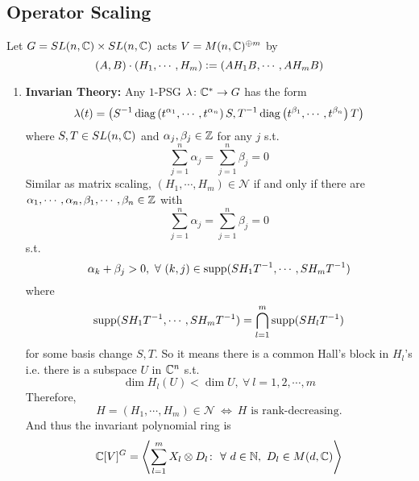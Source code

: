 \documentclass[a4paper,12pt]{article}
\begin{document}
	\subsection{Operator Scaling}
	
	Let $G = SL(n,\mathbb{C}) \times SL(n,\mathbb{C})$ acts $V = M(n,\mathbb{C})^{\oplus m}$ by
	\begin{equation*}
		(A,B) \cdot (H_1,\cdots,H_m) \vcentcolon= (AH_1B,\cdots,AH_mB)
	\end{equation*}
	
\begin{enumerate}
	\item \textbf{Invarian Theory:} Any $1$-PSG $\lambda \colon \mathbb{C}^* \rightarrow G$ has the form
		\begin{equation*}
			\lambda(t) = \left(S^{-1}\operatorname{diag}\left(t^{\alpha_1},\cdots,t^{\alpha_n}\right)S,T^{-1}\operatorname{diag}\left(t^{\beta_1},\cdots,t^{\beta_n}\right)T\right)
		\end{equation*}
		where $S,T \in SL(n,\mathbb{C})$ and $\alpha_j,\beta_j \in \mathbb{Z}$ for any $j$ s.t.
		\begin{equation*}
			\sum_{j=1}^n \alpha_j = \sum_{j=1}^n \beta_j = 0
		\end{equation*}
		Similar as matrix scaling, $(H_1,\cdots,H_m) \in \mathcal{N}$ if and only if there are \\
		$\alpha_1,\cdots,\alpha_n,\beta_1,\cdots,\beta_n \in \mathbb{Z}$ with
		\begin{equation*}
			\sum_{j=1}^n \alpha_j = \sum_{j=1}^n \beta_j = 0
		\end{equation*}
		s.t. 
		\begin{equation*}
			\alpha_k+\beta_j > 0,~\forall~ (k,j) \in \operatorname{supp}(SH_1T^{-1},\cdots,SH_mT^{-1})
		\end{equation*}
		where 
		\begin{equation*}
			\operatorname{supp}(SH_1T^{-1},\cdots,SH_mT^{-1}) = \bigcap_{l=1}^m\operatorname{supp}(SH_lT^{-1})
		\end{equation*}
		for some basis change $S,T$. So it means there is a common Hall's block in $H_l$'s i.e. there is a subspace $U$ in $\mathbb{C}^n$ s.t.
		\begin{equation*}
			\dim H_l(U) < \dim U,~\forall~l=1,2,\cdots,m
		\end{equation*}
		Therefore,
		\begin{equation*}
			H = (H_1,\cdots,H_m) \in \mathcal{N}~\Leftrightarrow~ H \text{ is rank-decreasing.}
		\end{equation*}
		And thus the invariant polynomial ring is
		\begin{equation*}
			\C[V]^G =  \inn{\sum_{l=1}^m X_l \otimes D_l \colon ~\forall~d \in \N,~D_l \in M(d,\C)}

\end{equation*}
\end{enumerate}
\end{document}
